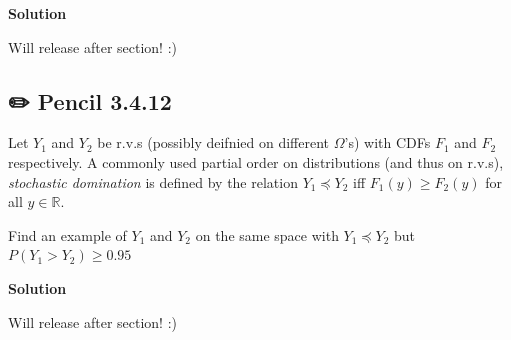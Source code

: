 \documentclass[
  letterpaper,
  DIV=11,
  numbers=noendperiod]{scrreprt}
\theoremstyle{definition}
\theoremstyle{plain}
\theoremstyle{remark}
\begin{document}
\begin{tcolorbox}[enhanced jigsaw, leftrule=.75mm, colframe=quarto-callout-tip-color-frame, colback=white, breakable, opacityback=0, left=2mm, bottomrule=.15mm, arc=.35mm, rightrule=.15mm, toprule=.15mm]
\begin{minipage}[t]{5.5mm}
\textcolor{quarto-callout-tip-color}{\faLightbulb}
\end{minipage}%
\begin{minipage}[t]{\textwidth - 5.5mm}

\textbf{Solution}\vspace{2mm}

Will release after section! :)

\end{minipage}%
\end{tcolorbox}

\hypertarget{pencil-3.4.12}{%
\subsection*{✏️ Pencil 3.4.12}\label{pencil-3.4.12}}

Let \(Y_1\) and \(Y_2\) be r.v.s (possibly deifnied on different
\(\Omega\)'s) with CDFs \(F_1\) and \(F_2\) respectively. A commonly
used partial order on distributions (and thus on r.v.s),
\emph{stochastic domination} is defined by the relation
\(Y_1 \preceq Y_2\) iff \(F_1(y) \geq F_2(y)\) for all
\(y \in \mathbb{R}\).

Find an example of \(Y_1\) and \(Y_2\) on the same space with
\(Y_1 \preceq Y_2\) but \(P(Y_1 > Y_2) \geq 0.95\)

\begin{tcolorbox}[enhanced jigsaw, leftrule=.75mm, colframe=quarto-callout-tip-color-frame, colback=white, breakable, opacityback=0, left=2mm, bottomrule=.15mm, arc=.35mm, rightrule=.15mm, toprule=.15mm]
\begin{minipage}[t]{5.5mm}
\textcolor{quarto-callout-tip-color}{\faLightbulb}
\end{minipage}%
\begin{minipage}[t]{\textwidth - 5.5mm}

\textbf{Solution}\vspace{2mm}

Will release after section! :)

\end{minipage}%
\end{tcolorbox}
\end{document}
